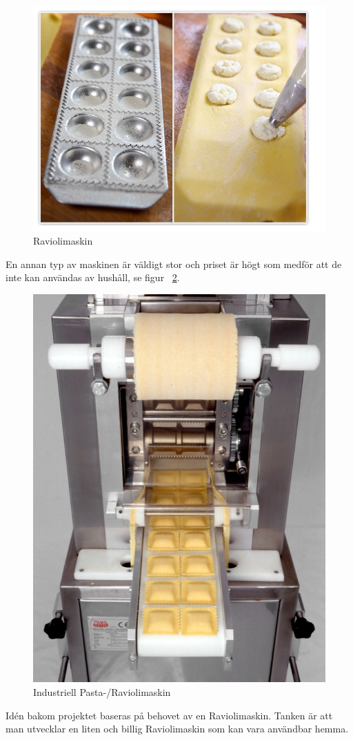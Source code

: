 	\begin{figure}[h]
		\begin{center}
			\includegraphics[scale=0.5]{images/raviolimoldwithfilling.jpg}
			\caption{Raviolimaskin}
			\label{ravioli}	
		\end{center}
	\end{figure}
En annan typ av maskinen är väldigt stor och priset är högt som medför att de inte kan användas av hushåll, se figur ~\ref{pastamaskin}.
 		\begin{figure}[h]
 			\begin{center}
 				\includegraphics[scale=3]{images/pastamachine.jpg}
 				\caption{Industriell Pasta-/Raviolimaskin}
 				\label{pastamaskin}	
 			\end{center}
 		\end{figure} 
Idén bakom projektet baseras på behovet av en Raviolimaskin. Tanken är att man utvecklar en liten och billig Raviolimaskin som kan vara användbar hemma.	